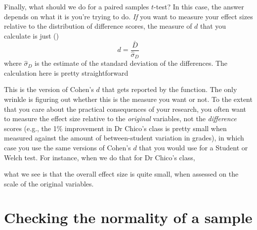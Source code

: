 

Finally, what should we do for a paired samples $t$-test? In this case, the answer depends on what it is you're trying to do. {\it If} you want to measure your effect sizes relative to the distribution of difference scores, the measure of $d$ that you calculate is just ()
$$
d = \frac{\bar{D}}{\hat{\sigma}_D}
$$
where $\hat{\sigma}_D$ is the estimate of the standard deviation of the differences. The calculation here is pretty straightforward
This is the version of Cohen's $d$ that gets reported by the  function. The only wrinkle is figuring out whether this is the measure you want or not. To the extent that you care about the practical consequences of your research, you often want to measure the effect size relative to the {\it original} variables, not the {\it difference} scores (e.g., the 1\% improvement in Dr Chico's class is pretty small when measured against the amount of between-student variation in grades), in which case you use the same versions of Cohen's $d$ that you would use for a Student or Welch test. For instance, when we do that for Dr Chico's class, 
what we see is that the overall effect size is quite small, when assessed on the scale of the original variables.






\section{Checking the normality of a sample\label{sec:shapiro}}

